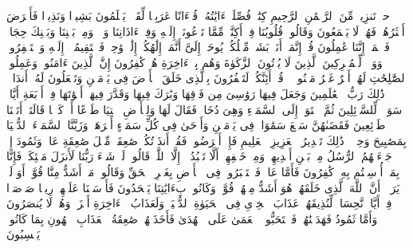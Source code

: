 \stopbuffer
\startbuffer[\q:41:1]
حمۤ%
\stopbuffer
\startbuffer[\q:41:2]
تَنزِیلࣱ مِّنَ ٱلرَّحۡمَٰنِ ٱلرَّحِیمِ%
\stopbuffer
\startbuffer[\q:41:3]
كِتَٰبࣱ فُصِّلَتۡ ءَایَٰتُهُۥ قُرۡءَانًا عَرَبِیࣰّا لِّقَوۡمࣲ یَعۡلَمُونَ%
\stopbuffer
\startbuffer[\q:41:4]
بَشِیرࣰا وَنَذِیرࣰا فَأَعۡرَضَ أَكۡثَرُهُمۡ فَهُمۡ لَا یَسۡمَعُونَ%
\stopbuffer
\startbuffer[\q:41:5]
وَقَالُوا۟ قُلُوبُنَا فِیۤ أَكِنَّةࣲ مِّمَّا تَدۡعُونَاۤ إِلَیۡهِ وَفِیۤ ءَاذَانِنَا وَقۡرࣱ وَمِنۢ بَیۡنِنَا وَبَیۡنِكَ حِجَابࣱ فَٱعۡمَلۡ إِنَّنَا عَٰمِلُونَ%
\stopbuffer
\startbuffer[\q:41:6]
قُلۡ إِنَّمَاۤ أَنَا۠ بَشَرࣱ مِّثۡلُكُمۡ یُوحَىٰۤ إِلَیَّ أَنَّمَاۤ إِلَٰهُكُمۡ إِلَٰهࣱ وَٰحِدࣱ فَٱسۡتَقِیمُوۤا۟ إِلَیۡهِ وَٱسۡتَغۡفِرُوهُۗ وَوَیۡلࣱ لِّلۡمُشۡرِكِینَ%
\stopbuffer
\startbuffer[\q:41:7]
ٱلَّذِینَ لَا یُؤۡتُونَ ٱلزَّكَوٰةَ وَهُم بِٱلۡءَاخِرَةِ هُمۡ كَٰفِرُونَ%
\stopbuffer
\startbuffer[\q:41:8]
إِنَّ ٱلَّذِینَ ءَامَنُوا۟ وَعَمِلُوا۟ ٱلصَّٰلِحَٰتِ لَهُمۡ أَجۡرٌ غَیۡرُ مَمۡنُونࣲ%
\stopbuffer
\startbuffer[\q:41:9]
۞ قُلۡ أَئِنَّكُمۡ لَتَكۡفُرُونَ بِٱلَّذِی خَلَقَ ٱلۡأَرۡضَ فِی یَوۡمَیۡنِ وَتَجۡعَلُونَ لَهُۥۤ أَندَادࣰاۚ ذَٰلِكَ رَبُّ ٱلۡعَٰلَمِینَ%
\stopbuffer
\startbuffer[\q:41:10]
وَجَعَلَ فِیهَا رَوَٰسِیَ مِن فَوۡقِهَا وَبَٰرَكَ فِیهَا وَقَدَّرَ فِیهَاۤ أَقۡوَٰتَهَا فِیۤ أَرۡبَعَةِ أَیَّامࣲ سَوَاۤءࣰ لِّلسَّاۤئِلِینَ%
\stopbuffer
\startbuffer[\q:41:11]
ثُمَّ ٱسۡتَوَىٰۤ إِلَى ٱلسَّمَاۤءِ وَهِیَ دُخَانࣱ فَقَالَ لَهَا وَلِلۡأَرۡضِ ٱئۡتِیَا طَوۡعًا أَوۡ كَرۡهࣰا قَالَتَاۤ أَتَیۡنَا طَاۤئِعِینَ%
\stopbuffer
\startbuffer[\q:41:12]
فَقَضَىٰهُنَّ سَبۡعَ سَمَٰوَاتࣲ فِی یَوۡمَیۡنِ وَأَوۡحَىٰ فِی كُلِّ سَمَاۤءٍ أَمۡرَهَاۚ وَزَیَّنَّا ٱلسَّمَاۤءَ ٱلدُّنۡیَا بِمَصَٰبِیحَ وَحِفۡظࣰاۚ ذَٰلِكَ تَقۡدِیرُ ٱلۡعَزِیزِ ٱلۡعَلِیمِ%
\stopbuffer
\startbuffer[\q:41:13]
فَإِنۡ أَعۡرَضُوا۟ فَقُلۡ أَنذَرۡتُكُمۡ صَٰعِقَةࣰ مِّثۡلَ صَٰعِقَةِ عَادࣲ وَثَمُودَ%
\stopbuffer
\startbuffer[\q:41:14]
إِذۡ جَاۤءَتۡهُمُ ٱلرُّسُلُ مِنۢ بَیۡنِ أَیۡدِیهِمۡ وَمِنۡ خَلۡفِهِمۡ أَلَّا تَعۡبُدُوۤا۟ إِلَّا ٱللَّهَۖ قَالُوا۟ لَوۡ شَاۤءَ رَبُّنَا لَأَنزَلَ مَلَٰۤئِكَةࣰ فَإِنَّا بِمَاۤ أُرۡسِلۡتُم بِهِۦ كَٰفِرُونَ%
\stopbuffer
\startbuffer[\q:41:15]
فَأَمَّا عَادࣱ فَٱسۡتَكۡبَرُوا۟ فِی ٱلۡأَرۡضِ بِغَیۡرِ ٱلۡحَقِّ وَقَالُوا۟ مَنۡ أَشَدُّ مِنَّا قُوَّةًۖ أَوَ لَمۡ یَرَوۡا۟ أَنَّ ٱللَّهَ ٱلَّذِی خَلَقَهُمۡ هُوَ أَشَدُّ مِنۡهُمۡ قُوَّةࣰۖ وَكَانُوا۟ بِءَایَٰتِنَا یَجۡحَدُونَ%
\stopbuffer
\startbuffer[\q:41:16]
فَأَرۡسَلۡنَا عَلَیۡهِمۡ رِیحࣰا صَرۡصَرࣰا فِیۤ أَیَّامࣲ نَّحِسَاتࣲ لِّنُذِیقَهُمۡ عَذَابَ ٱلۡخِزۡیِ فِی ٱلۡحَیَوٰةِ ٱلدُّنۡیَاۖ وَلَعَذَابُ ٱلۡءَاخِرَةِ أَخۡزَىٰۖ وَهُمۡ لَا یُنصَرُونَ%
\stopbuffer
\startbuffer[\q:41:17]
وَأَمَّا ثَمُودُ فَهَدَیۡنَٰهُمۡ فَٱسۡتَحَبُّوا۟ ٱلۡعَمَىٰ عَلَى ٱلۡهُدَىٰ فَأَخَذَتۡهُمۡ صَٰعِقَةُ ٱلۡعَذَابِ ٱلۡهُونِ بِمَا كَانُوا۟ یَكۡسِبُونَ%
